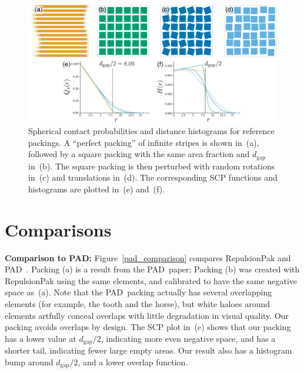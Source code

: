 \begin{figure}[t]
\centering
\includegraphics[width=1.0\textwidth]{figures/metrics/hsr_viz.pdf}
\caption[Spherical contact probabilities and distance histograms \newline for reference packings]
{\label{hsr_viz}
Spherical contact probabilities and distance histograms for 
reference packings.
A ``perfect packing'' of infinite stripes is shown in~(a),
followed by a square packing with the same area fraction and $d_\mathrm{gap}$
in~(b).  The square packing is then perturbed with random rotations in~(c)
and translations in~(d). The corresponding SCP functions and histograms are plotted
in~(e) and~(f).}
\end{figure}


\section{Comparisons}


\textbf{Comparison to PAD:} 
Figure~\ref{pad_comparison} compares
RepulsionPak and PAD~\cite{Kwan2016}.  Packing (a) is
a result from the PAD\ paper; Packing (b) was created with RepulsionPak using
the same elements, and calibrated to have the same negative space as~(a).
Note that the PAD\ packing actually has several overlapping elements
(for example, the tooth and the horse), but white haloes around
elements artfully conceal overlaps with little degradation in
visual quality.  Our packing avoids overlaps by design.
The SCP plot in~(c) shows that our packing has a lower value at $d_\mathrm{gap}/2$,
indicating more even negative space, and has a shorter tail,
indicating fewer large empty areas.
Our result also has a histogram bump around $d_\mathrm{gap}/2$, and 
a lower overlap function.

